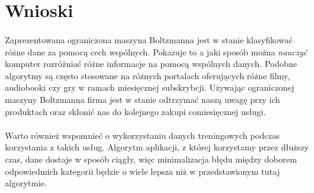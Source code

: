 \section{Wnioski}
    \paragraph{}
	Zaprezentowana ograniczona maszyna Boltzmanna jest w stanie klasyfikować różne dane za pomocą cech wspólnych.
	Pokazuje to a jaki sposób można \textit{nauczyć} komputer rozróżniać różne informacje na pomocą wspólnych danych.
	Podobne algorytmy są często stosowane na różnych portalach oferujących różne filmy, audiobooki czy gry w ramach miesięcznej subskrybcji.
	Używając ograniczonej maszyny Boltzmanna firma jest w stanie odtrzymać naszą uwagę przy ich produktach oraz skłonić nas
	do kolejnego zakupi comiesięcznej usługi.
    \paragraph{}
	Warto również wspomnieć o wykorzystaniu danych treningowych podczas korzystania z takich usług. Algorytm aplikacji,
	z której korzystamy przez dłuższy czas, dane dostaje w sposób ciągły, więc minimalizacja błędu między doborem odpowiedmich kategorii
	będzie o wiele lepsza niż w przedstawionym tutaj algorytmie. 
